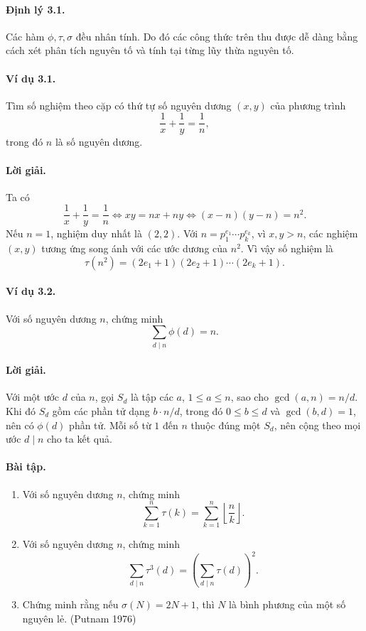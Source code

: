 \documentclass[11pt]{article}
\begin{document}
\paragraph{Định lý 3.1.}
Các hàm \(\phi,\tau,\sigma\) đều nhân tính. Do đó các công thức trên thu được
dễ dàng bằng cách xét phân tích nguyên tố và tính tại từng lũy thừa nguyên tố.

\paragraph{Ví dụ 3.1.}
Tìm số nghiệm theo cặp có thứ tự số nguyên dương \((x,y)\) của phương trình
\[
 \frac1x+\frac1y=\frac1n,
\]
trong đó \(n\) là số nguyên dương.

\paragraph{Lời giải.}
Ta có
\[
 \frac1x+\frac1y=\frac1n
 \Longleftrightarrow xy=nx+ny
 \Longleftrightarrow (x-n)(y-n)=n^2.
\]
Nếu \(n=1\), nghiệm duy nhất là \((2,2)\). Với
\(n=p_1^{e_1}\cdots p_k^{e_k}\), vì \(x,y>n\), các nghiệm \((x,y)\) tương ứng
song ánh với các ước dương của \(n^2\). Vì vậy số nghiệm là
\[
 \tau(n^2)=(2e_1+1)(2e_2+1)\cdots(2e_k+1).
\]

\paragraph{Ví dụ 3.2.}
Với số nguyên dương \(n\), chứng minh
\[
 \sum_{d\mid n}\phi(d)=n.
\]

\paragraph{Lời giải.}
Với một ước \(d\) của \(n\), gọi \(S_d\) là tập các \(a\), \(1\le a\le n\), sao
cho \(\gcd(a,n)=n/d\). Khi đó \(S_d\) gồm các phần tử dạng \(b\cdot n/d\),
trong đó \(0\le b\le d\) và \(\gcd(b,d)=1\), nên có \(\phi(d)\) phần tử. Mỗi
số từ \(1\) đến \(n\) thuộc đúng một \(S_d\), nên cộng theo mọi ước \(d\mid n\)
cho ta kết quả.

\paragraph{Bài tập.}
\begin{enumerate}
\item Với số nguyên dương \(n\), chứng minh
\[
 \sum_{k=1}^n\tau(k)=\sum_{k=1}^n\left\lfloor\frac nk\right\rfloor.
\]
\item Với số nguyên dương \(n\), chứng minh
\[
 \sum_{d\mid n}\tau^3(d)=\left(\sum_{d\mid n}\tau(d)\right)^2.
\]
\item Chứng minh rằng nếu \(\sigma(N)=2N+1\), thì \(N\) là bình phương của một
số nguyên lẻ. (Putnam 1976)
\end{enumerate}
\end{document}
